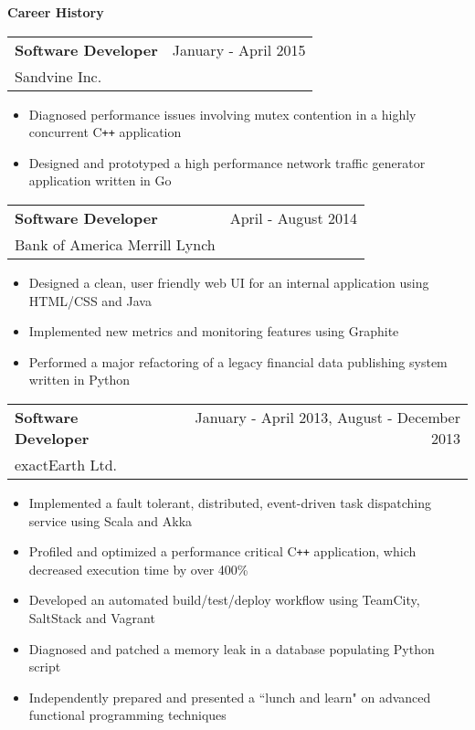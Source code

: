 \documentclass[10pt]{article}
\makeatletter
\newcommand{\resheading}[1]{{\large \colorbox{headercol}{\begin{minipage}{\textwidth}{\textbf{#1 \vphantom{p\^{E}}}}\end{minipage}}}}
\newcommand{\ressubheading}[3]{\item
\begin{tabular*}{7in}{l@{\extracolsep{\fill}}r}
    \textbf{#1} & #2 \\ #3
\end{tabular*}\vspace{-4pt}}
\makeatother
\begin{document}
\resheading{Career History}
\begin{description}
    \ressubheading{Software Developer} {January - April 2015} {Sandvine Inc.}
    \begin{itemize}
        \item{Diagnosed performance issues involving mutex contention in a highly concurrent C\texttt{++} application}
        \item{Designed and prototyped a high performance network traffic generator application written in Go}
    \end{itemize}

    \ressubheading{Software Developer} {April - August 2014} {Bank of America Merrill Lynch}
    \begin{itemize}
        \item{Designed a clean, user friendly web UI for an internal application using HTML/CSS and Java}
        \item{Implemented new metrics and monitoring features using Graphite}
        \item{Performed a major refactoring of a legacy financial data publishing system written in Python}
    \end{itemize}

    \ressubheading{Software Developer} {January - April 2013, August - December 2013} {exactEarth Ltd.}
    \begin{itemize}
        \item{Implemented a fault tolerant, distributed, event-driven task dispatching service using Scala and Akka}
        \item{Profiled and optimized a performance critical C\texttt{++} application, which decreased execution time by over 400\%}
        \item{Developed an automated build/test/deploy workflow using TeamCity, SaltStack and Vagrant}
        \item{Diagnosed and patched a memory leak in a database populating Python script}
        \item{Independently prepared and presented a ``lunch and learn" on advanced functional programming techniques}
    \end{itemize}


\end{description}
\end{document}
